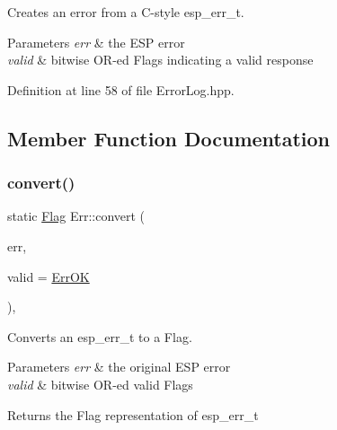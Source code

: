 Creates an error from a C-\/style esp\+\_\+err\+\_\+t. 
\begin{DoxyParams}{Parameters}
{\em err} & the E\+SP error \\
\hline
{\em valid} & bitwise O\+R-\/ed Flags indicating a valid response \\
\hline
\end{DoxyParams}


Definition at line 58 of file Error\+Log.\+hpp.


\begin{DoxyCode}{0}

\end{DoxyCode}


\subsection{Member Function Documentation}
\mbox{\label{classErr_af320160955e90df0ddb4e84d99027562}} 
\subsubsection{\texorpdfstring{convert()}{convert()}}
{\footnotesize\ttfamily static \mbox{\hyperlink{classErr_a5027803a04dbda5395326274137d63ff}{Flag}} Err\+::convert (\begin{DoxyParamCaption}\item[{esp\+\_\+err\+\_\+t}]{err,  }\item[{\mbox{\hyperlink{classErr_a5027803a04dbda5395326274137d63ff}{Flag}}}]{valid = {\ttfamily \mbox{\hyperlink{classErr_a5027803a04dbda5395326274137d63ffa32bb3ca49d660fa0525cba5aeb786059}{Err\+OK}}} }\end{DoxyParamCaption})\hspace{0.3cm}{\ttfamily [inline]}, {\ttfamily [static]}}

Converts an esp\+\_\+err\+\_\+t to a Flag.


\begin{DoxyParams}{Parameters}
{\em err} & the original E\+SP error \\
\hline
{\em valid} & bitwise O\+R-\/ed valid Flags \\
\hline
\end{DoxyParams}
\begin{DoxyReturn}{Returns}
the Flag representation of esp\+\_\+err\+\_\+t 
\end{DoxyReturn}


